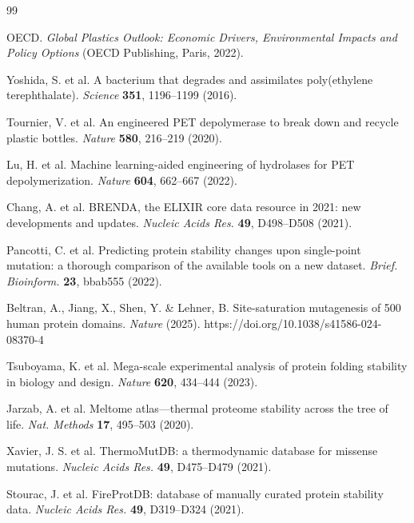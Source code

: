 \documentclass[sn-nature]{sn-jnl}%
\begin{document}
\begin{thebibliography}{99}

OECD. \textit{Global Plastics Outlook: Economic Drivers, Environmental Impacts and Policy
Options} (OECD Publishing, Paris, 2022).

Yoshida, S. et al. A bacterium that degrades and assimilates poly(ethylene terephthalate).
\textit{Science} \textbf{351}, 1196--1199 (2016).

Tournier, V. et al. An engineered PET depolymerase to break down and recycle plastic bottles.
\textit{Nature} \textbf{580}, 216--219 (2020).

Lu, H. et al. Machine learning-aided engineering of hydrolases for PET depolymerization.
\textit{Nature} \textbf{604}, 662--667 (2022).

Chang, A. et al. BRENDA, the ELIXIR core data resource in 2021: new developments and updates.
\textit{Nucleic Acids Res.} \textbf{49}, D498--D508 (2021).

Pancotti, C. et al. Predicting protein stability changes upon single-point mutation: a thorough
comparison of the available tools on a new dataset. \textit{Brief. Bioinform.} \textbf{23},
bbab555 (2022).

Beltran, A., Jiang, X., Shen, Y. \& Lehner, B. Site-saturation mutagenesis of 500 human
protein domains. \textit{Nature} (2025). https://doi.org/10.1038/s41586-024-08370-4

Tsuboyama, K. et al. Mega-scale experimental analysis of protein folding stability in biology
and design. \textit{Nature} \textbf{620}, 434--444 (2023).

Jarzab, A. et al. Meltome atlas---thermal proteome stability across the tree of life.
\textit{Nat. Methods} \textbf{17}, 495--503 (2020).

Xavier, J. S. et al. ThermoMutDB: a thermodynamic database for missense mutations.
\textit{Nucleic Acids Res.} \textbf{49}, D475--D479 (2021).

Stourac, J. et al. FireProtDB: database of manually curated protein stability data.
\textit{Nucleic Acids Res.} \textbf{49}, D319--D324 (2021).


\end{thebibliography}
\end{document}

